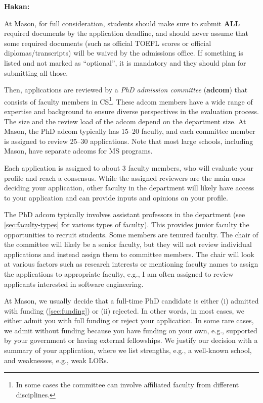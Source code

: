 \documentclass[oneside,11pt,dvipsnames]{book}
\newenvironment{commentbox}[1][]{
  \small
  \begin{mybox}
    {\small \textbf{#1}}
  }{
  \end{mybox}
}
\begin{document}
\begin{commentbox}[Hakan:]
  At Mason, for full consideration, students should make sure to submit \textbf{ALL} required documents by the application deadline, and should never assume that some required documents (such as official TOEFL scores or official diplomas/transcripts) will be waived by the admissions office. If something is listed and not marked as ``optional'', it is mandatory and they should plan for submitting all those.
\end{commentbox}

Then, applications are reviewed by a \emph{PhD admission committee} (\textbf{adcom}) that consists of faculty members in CS\footnote{In some cases the committee can involve affiliated faculty from different disciplines.}. These adcom members have a wide range of expertise and background to ensure diverse perspectives in the evaluation process. The size and the review load of the adcom depend on the department size. At Mason, the PhD adcom typically has 15--20 faculty, and each committee member is assigned to review 25--30 applications. Note that most large schools, including Mason, have separate adcoms for MS programs.

Each application is assigned to about 3 faculty members, who will evaluate your profile and reach a consensus.  While the assigned reviewers are the main ones deciding your application, other faculty in the department will likely have access to your application and can provide inputs and opinions on your profile.

The PhD adcom typically involves assistant professors in the department (see \autoref{sec:faculty-types} for various types of faculty). This provides junior faculty the opportunities to recruit students. Some members are tenured faculty. The chair of the committee will likely be a senior faculty, but they will not review individual applications and instead assign them to committee members. The chair will look at various factors such as research interests or mentioning faculty names to assign the applications to appropriate faculty, e.g., I am often assigned to review applicants interested in software engineering.

At Mason, we usually decide that a full-time PhD candidate is either (i) admitted with funding (\autoref{sec:funding}) or (ii) rejected. In other words, in most cases, we either
admit you with full funding or reject your application. In some rare cases, we admit
without funding because you have funding on your own, e.g.,
supported by your government or having external fellowships. We justify
our decision with a summary of your application, where we list
strengths, e.g., a well-known school, and weaknesses, e.g., weak
LORs.
\end{document}
